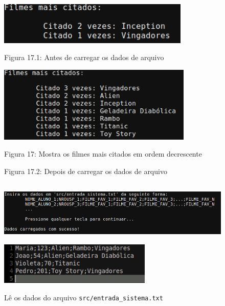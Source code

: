 \documentclass[12pt,a4paper,portuguese]{article}
\begin{document}
        \begin{figure}[H]
            \centering
            \includegraphics[height=2cm]{imgs/filmes_mais_citados.png}
            \vspace{-10px}
            \caption*{Figura 17.1: Antes de carregar os dados de arquivo}
            \includegraphics[height=3.6cm]{imgs/filmes_mais_citados_2.png}
            \vspace{-10px}
            \caption*{Figura 17.2: Depois de carregar os dados de arquivo}
            Figura 17: Mostra os filmes mais citados em ordem decrescente
        \end{figure}

        \setcounter{figure}{17}

        \begin{figure}[H]
            \centering
            \includegraphics[height=3cm]{imgs/carregar_de_arquivo.png}
            \includegraphics[height=2cm]{imgs/carregar_de_arquivo_insercao.png}
            \caption{Lê os dados do arquivo \texttt{src/entrada\_sistema.txt}}
        \end{figure}
\end{document}
